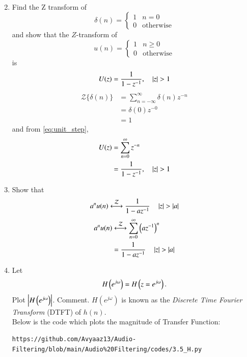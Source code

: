 \documentclass[journal,12pt,twocolumn]{IEEEtran}
\theoremstyle{remark}
\renewcommand\thesection{\arabic{section}}
\numberwithin{equation}{subsection}
\begin{document}
\begin{enumerate}[label=\thesection.\arabic*]
\begin{align}
\label{eq:freq_resp}
\end{align}
%
\item Find the Z transform of 
\begin{equation}
\delta(n)
=
\begin{cases}
1 & n = 0
\\
0 & \text{otherwise}
\end{cases}
\end{equation}
and show that the $Z$-transform of
\begin{equation}
\label{eq:unit_step}
u(n)
=
\begin{cases}
1 & n \ge 0
\\
0 & \text{otherwise}
\end{cases}
\end{equation}
is
\begin{equation}
U(z) = \frac{1}{1-z^{-1}}, \quad \left\vert z\right\vert > 1
\end{equation}
\solution
\begin{align}
{\mathcal{Z}}\{\delta(n)\} &= \sum_{n=-\infty}^{\infty}\delta(n)z^{-n}\\
&= \delta(0)z^{-0}\\
&= 1
\end{align}
and from \eqref{eq:unit_step},
\begin{align}
U(z) &= \sum _{n= 0}^{\infty}z^{-n}
\\
&=\frac{1}{1-z^{-1}}, \quad \left\vert z\right\vert > 1
\end{align}
%
\item Show that 
\begin{equation}
\label{eq:anun}
a^nu(n) \system{Z} \frac{1}{1-az^{-1}} \quad \abs{z} > \abs{a}
\end{equation}
\solution 
\begin{align}
	a^nu(n) &\system{Z} \sum_{n = 0}^{\infty}\brak{az^{-1}}^n \\
			&= \frac{1}{1-az^{-1}} \quad \abs{z} > \abs{a}
\end{align}
%
\item 
Let
\begin{equation}
	H\left(e^{j \omega}\right) = H\left(z = e^{j \omega}\right).
\end{equation}
Plot $\left\vert H\left(e^{j \omega}\right)\right\vert$.  Comment.  $H(e^{j \omega})$ is
known as the {\em Discrete Time Fourier Transform} (DTFT) of $h(n)$.
\\
\solution Below is the code which plots the magnitude of Transfer Function:
\begin{lstlisting}
https://github.com/Avyaaz13/Audio-Filtering/blob/main/Audio%20Filtering/codes/3.5_H.py
\end{lstlisting}



\end{enumerate}
\end{document}
